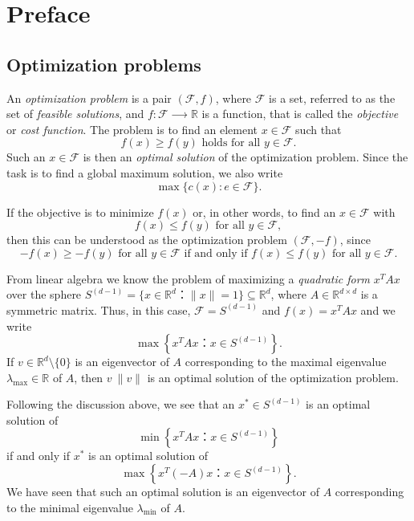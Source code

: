 
\chapter{Preface}
\label{cha:preface}


\section{Optimization problems}
\label{sec:optim-probl}

An \emph{optimization problem} is a pair $(ℱ,f)$, where $ℱ$ is a set, referred to as the set of \emph{feasible solutions},  and $f: ℱ ⟶ ℝ$ is a function, that is called the \emph{objective} or \emph{cost function}. The problem is to find an element $x ∈ ℱ$ such that
\begin{displaymath}
  f(x) ≥ f(y) \text{ holds for all } y ∈ ℱ. 
\end{displaymath}
Such an $x∈ ℱ$  is then an \emph{optimal solution} of the optimization problem.
Since the task is to find a global  maximum solution, we also write 
\begin{displaymath}
  \max \{ c(x) : e ∈ ℱ\}. 
\end{displaymath}

If the objective is to minimize $f(x)$ or, in other words, to find an $x ∈ ℱ$ with  
\begin{displaymath}
  f(x) ≤ f(y) \text{ for all } y ∈ ℱ,
\end{displaymath}
then this can be understood as the optimization problem $(ℱ,-f)$, since 
\begin{displaymath}
  -f(x) ≥ - f(y) \text{ for all } y ∈ ℱ \text{ if and only if }  f(x) ≤ f(y) \text{ for all } y ∈ ℱ. 
\end{displaymath}

\begin{example}
  \label{exe:1}
  From linear algebra we know the problem of maximizing  a
  \emph{quadratic form} $ x^T A x$ over the sphere
  $S^{(d-1)} = \{ x ∈ ℝ^d ： \|x\| = 1 \} ⊆ ℝ^d$, where $A ∈ ℝ^{d×d}$ is a symmetric
  matrix.  Thus, in this case,   $ℱ = S^{(d-1)}$ and $f(x) = x^T A x$ and we write
  \begin{displaymath}
    \max\left\{ x^T A x ： x ∈S^{(d-1)} \right\}. 
  \end{displaymath}
  If $v ∈ ℝ^d \setminus \{0\}$ is an eigenvector of $A$ corresponding to the
  maximal eigenvalue $λ_{\max} ∈ ℝ$ of $A$, then $v \ \|v\|$ is an optimal
  solution of the optimization problem.

  Following the discussion above, we see that an $x^* ∈ S^{(d-1)}$ is an optimal solution of
  \begin{displaymath}
    \min\left\{ x^T A x ： x ∈S^{(d-1)} \right\} 
  \end{displaymath}
  if and only if $x^*$ is an optimal solution of
   \begin{displaymath}
    \max\left\{ x^T (-A) x ： x ∈S^{(d-1)} \right\} . 
  \end{displaymath}
  We have seen that such an optimal solution is an eigenvector of $A$ corresponding to the minimal eigenvalue $λ_{\min}$ of $A$. 
\end{example}




